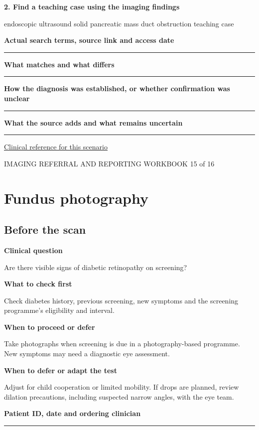 \documentclass[11pt,a4paper]{article}
\newcommand{\record}[1]{\textbf{#1}\par\vspace{0.55\baselineskip}\hrule\vspace{0.35\baselineskip}}
\begin{document}
\textbf{2. Find a teaching case using the imaging findings}\par endoscopic ultrasound solid pancreatic mass duct obstruction teaching case\par

\record{Actual search terms, source link and access date}

\record{What matches and what differs}

\record{How the diagnosis was established, or whether confirmation was unclear}

\record{What the source adds and what remains uncertain}

\small\href{https://pubmed.ncbi.nlm.nih.gov/39387777/}{Clinical reference for this scenario}

\normalsize

\newpage

{\small IMAGING REFERRAL AND REPORTING WORKBOOK \hfill 15 of 16}

\section*{Fundus photography}

\subsection*{Before the scan}

\textbf{Clinical question}\par Are there visible signs of diabetic retinopathy on screening?\par

\textbf{What to check first}\par Check diabetes history, previous screening, new symptoms and the screening programme's eligibility and interval.\par

\textbf{When to proceed or defer}\par Take photographs when screening is due in a photography-based programme. New symptoms may need a diagnostic eye assessment.\par

\textbf{When to defer or adapt the test}\par Adjust for child cooperation or limited mobility. If drops are planned, review dilation precautions, including suspected narrow angles, with the eye team.\par

\record{Patient ID, date and ordering clinician}
\end{document}
